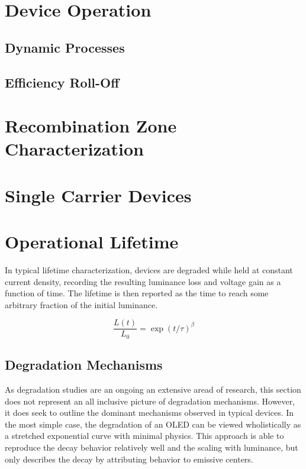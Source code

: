 \documentclass[../thesis.tex]{subfiles}
\begin{document}
\section{Device Operation}
\subsection{Dynamic Processes}
\subsection{Efficiency Roll-Off}

\section{Recombination Zone Characterization}\label{sec:rz_measurement}

\section{Single Carrier Devices}

\section{Operational Lifetime}
In typical lifetime characterization, devices are degraded while held at constant current density, recording the resulting luminance loss and voltage gain as a function of time.  
The lifetime is then reported as the time to reach some arbitrary fraction of the initial luminance.

\begin{equation}
\frac{L(t)}{L_0}=\exp (t/\tau)^\beta
\label{eqn:stretched_exponential}
\end{equation}



\subsection{Degradation Mechanisms}\label{sec:degradation_mechanisms}

As degradation studies are an ongoing an extensive aread of research, this section does not represent an all inclusive picture of degradation mechanisms.  However, it does seek to outline the dominant mechanisms observed in typical devices.
In the most simple case, the degradation of an OLED can be viewed wholistically as a stretched exponential curve with minimal physics.\supercite{Scholz2015,Fry2005a}
This approach is able to reproduce the decay behavior relatively well and the scaling with luminance, but only describes the decay by attributing behavior to emissive centers.
\end{document}
